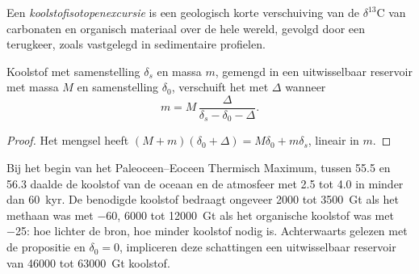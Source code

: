 \begin{definition}[Koolstofisotopenexcursie]\label{def:b3:stable-isotopes:cie}
Een \emph{koolstofisotopenexcursie} is een
geologisch korte verschuiving van de $\delta^{13}\mathrm C$ van carbonaten en organisch
materiaal over de hele wereld, gevolgd door een terugkeer, zoals vastgelegd in sedimentaire profielen.
\end{definition}

\begin{proposition}\label{prop:b3:stable-isotopes:cie-mass}
Koolstof met samenstelling $\delta_s$ en massa $m$, gemengd in een uitwisselbaar
reservoir met massa $M$ en samenstelling $\delta_0$, verschuift het met $\Delta$ wanneer
\[
m = M\,\frac{\Delta}{\delta_s - \delta_0 - \Delta}.
\]
\end{proposition}

\begin{proof}
Het mengsel heeft $(M + m)(\delta_0 + \Delta) = M\delta_0 + m\delta_s$, lineair in
$m$.
\end{proof}

Bij het begin van het Paleoceen--Eoceen Thermisch Maximum, tussen 55.5 en
\qty{56.3}{\Ma} daalde de koolstof van de oceaan en de atmosfeer met 2.5 tot
\qty{4.0}{\permil} in minder dan \qty{60}{kyr}. De benodigde koolstof bedraagt ongeveer
2000 tot \qty{3500}{Gt} als het methaan was met \qty{-60}{\permil}, 6000 tot
\qty{12000}{Gt} als het organische koolstof was met \qty{-25}{\permil}: hoe lichter de
bron, hoe minder koolstof nodig is. Achterwaarts gelezen met de propositie
en $\delta_0 = 0$, impliceren deze schattingen een uitwisselbaar reservoir van \num{46000}
tot \qty{63000}{Gt} koolstof.


